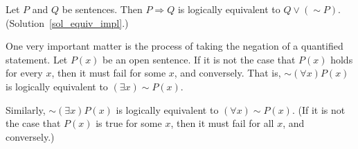 \begin{exer}\label{equiv_impl} Let $P$ and $Q$ be sentences. Then $P \Rightarrow Q$ is logically
equivalent to $Q \lor (\sim P)$.  (Solution~\ref{sol_equiv_impl}.)
\end{exer}

One very important matter is the process of taking the negation of a quantified statement. Let
$P(x)$ be an open sentence. If it is not the case that $P(x)$ holds for every $x$, then it
must fail for some $x$, and conversely. That is, $\sim(\forall x)P(x)$ is logically equivalent
to $(\exists x)\sim P(x)$.

Similarly, $\sim(\exists x)P(x)$ is logically equivalent to $(\forall x)\sim P(x)$. (If it is
not the case that $P(x)$ is true for some $x$, then it must fail for all $x$, and conversely.)

